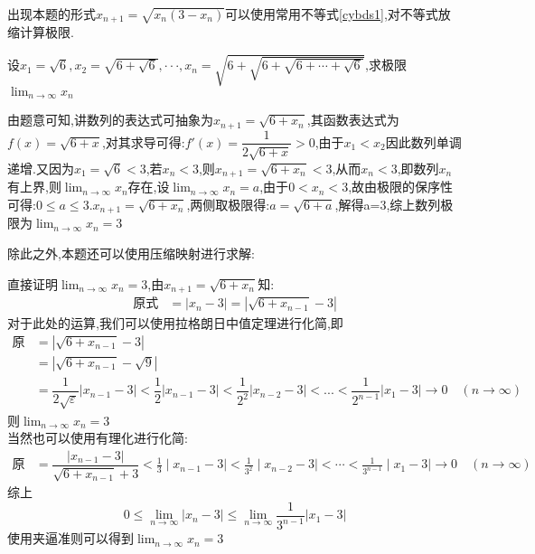 \documentclass[8pt a4paper, oneside, UTF8]{ctexbook}
\begin{document}
\begin{sloppypar}
\begin{note}
        出现本题的形式$x_{n+1}=\sqrt{x_n(3-x_n)}$可以使用常用不等式\ref{cybds1},对不等式放缩计算极限.
    \end{note}
    \begin{problem}
        设$x_1=\sqrt{6},x_2=\sqrt{6+\sqrt{6}},\cdotp\cdotp\cdotp,x_n=\sqrt{6+\sqrt{6+\sqrt{6+\cdots+\sqrt{6}}}}$,求极限$\lim_{n \to \infty}x_n$
    \end{problem}
    \begin{solution}
        由题意可知,讲数列的表达式可抽象为$x_{n+1}=\sqrt{6+x_n}$,其函数表达式为$f(x)=\sqrt{6+x}$,对其求导可得:$f'(x)=\dfrac{1}{2\sqrt{6+x}}>0$,由于$x_1<x_2$因此数列单调递增.又因为$x_1=\sqrt{6}<3$,若$x_n<3$,则$x_{n+1}=\sqrt{6+x_n}<3$,从而$x_n<3$,即数列$x_n$有上界,则$\lim_{n\to \infty} x_n$存在,设$\lim_{n\to \infty}x_n=a$,由于$0<x_n<3$,故由极限的保序性可得:$0\leqslant a \leqslant 3$.$x_{n+1}=\sqrt{6+x_n}$,两侧取极限得:$a=\sqrt{6+a}$,解得a=3,综上数列极限为$\lim_{n\to \infty }x_n=3$
    \end{solution}
    \begin{note}
        除此之外,本题还可以使用压缩映射进行求解:
        \begin{solution}
            直接证明$\lim_{n\to \infty}x_n=3$,由$x_{n+1}=\sqrt{6+x_n}$知:\begin{align*}
              \text{原式} & =|x_n-3|=|\sqrt{6+x_{n-1}}-3|
            \end{align*}
            对于此处的运算,我们可以使用拉格朗日中值定理进行化简,即
            \begin{align*}
              \text{原式} & =|\sqrt{6+x_{n-1}}-3| \\
              & = |\sqrt{6+x_{n-1}}-\sqrt{9}|\\
              & = \dfrac{1}{2\sqrt{\varepsilon}}|x_{n-1}-3|<\dfrac{1}{2}|x_{n-1}-3|<\dfrac{1}{2^2}|x_{n-2}-3|<...<\dfrac{1}{2^{n-1}}|x_1-3|\to 0 \quad (n\to \infty)
            \end{align*}
            则$\lim_{n\to \infty}x_n=3$\\
            当然也可以使用有理化进行化简:
            \begin{align*}
              \text{原式} & =\dfrac{|x_{n-1}-3|}{\sqrt{6+x_{n-1}}+3}<\frac{1}{3}\mid x_{n-1}-3\mid<\frac{1}{3^{2}}\mid x_{n-2}-3\mid<\cdots<\frac{1}{3^{n-1}}\mid x_{1}-3\mid\to0 \quad (n\to \infty)
            \end{align*}
            综上
            $$
                0 \leqslant \lim_{n\to \infty}|x_n-3| \leqslant \lim_{n\to \infty} \dfrac{1}{3^{n-1}}|x_1-3|
            $$使用夹逼准则可以得到$\lim_{n\to \infty}x_n=3$

\end{solution}
\end{note}
\end{sloppypar}
\end{document}
